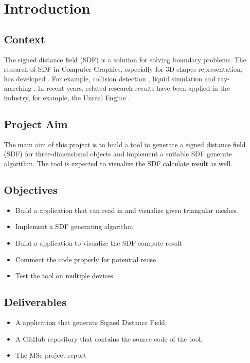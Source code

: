 \chapter{Introduction}
\label{chapter1}
\section{Context}
The signed distance field (SDF) is a solution for solving boundary problems. The research of SDF in Computer Graphics, especially for 3D shapes representation, has developed \cite{SDFSurvey}. For example, collision detection \cite{RigidDetec} \cite{SoftDetec}, liquid simulation \cite{liquid} and ray-marching \cite{hart1996sphere}. In recent years, related research results have been applied in the industry, for example, the Unreal Engine \cite{uesdf}.

\section{Project Aim}

The main aim of this project is to build a tool to generate a signed distance field (SDF) for three-dimensional objects and implement a suitable SDF generate algorithm. The tool is expected to visualize the SDF calculate result as well.

\section{Objectives}

\begin{itemize}
    \item Build a application that can read in and visualize given triangular meshes.
    \item Implement a SDF generating algorithm.
    \item Build a application to visualize the SDF compute result
    \item Comment the code properly for potential reuse
    \item Test the tool on multiple devices
\end{itemize}

\section{Deliverables}

\begin{itemize}
    \item A application that generate Signed Distance Field.
    \item A GitHub repository that contains the source code of the tool.
    \item The MSc project report
\end{itemize}

